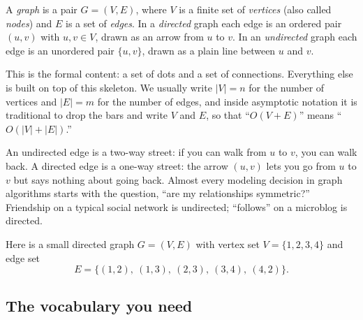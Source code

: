 \begin{definition}[Graph]
\label{ch39:def-graph}
A \emph{graph} is a pair $G = (V, E)$, where $V$ is a finite set of
\emph{vertices} (also called \emph{nodes}) and $E$ is a set of \emph{edges}. In a
\emph{directed} graph each edge is an ordered pair $(u, v)$ with $u, v \in V$,
drawn as an arrow from $u$ to $v$. In an \emph{undirected} graph each edge is an
unordered pair $\{u, v\}$, drawn as a plain line between $u$ and $v$.
\end{definition}

This is the formal content: a set of dots and a set of connections. Everything else is built on top of this skeleton. We usually write $\lvert V \rvert = n$ for the number of
vertices and $\lvert E \rvert = m$ for the number of edges, and inside asymptotic
notation it is traditional to drop the bars and write $V$ and $E$, so that
``$O(V + E)$'' means ``$O(\lvert V \rvert + \lvert E \rvert)$.''

\begin{intuitionbox}
An undirected edge is a two-way street: if you can walk from $u$ to $v$, you can
walk back. A directed edge is a one-way street: the arrow $(u,v)$ lets you go from
$u$ to $v$ but says nothing about going back. Almost every modeling decision in
graph algorithms starts with the question, ``are my relationships symmetric?''
Friendship on a typical social network is undirected; ``follows'' on a microblog
is directed.
\end{intuitionbox}

Here is a small directed graph $G = (V, E)$ with vertex set
$V = \{1, 2, 3, 4\}$ and edge set
\[
E = \{(1,2),\ (1,3),\ (2,3),\ (3,4),\ (4,2)\}.
\]

\begin{center}
\end{center}

\subsection{The vocabulary you need}

